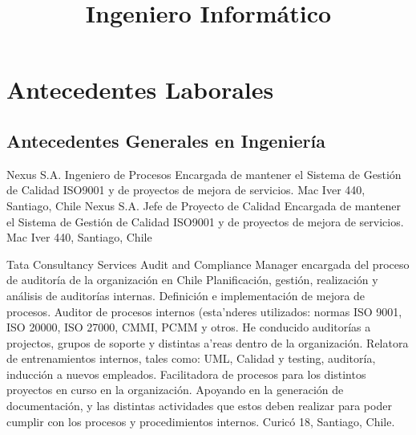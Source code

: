 \documentclass[11pt,letterpaper,roman]{moderncv}
\title{\normalfont \small Ingeniero Informático}
\begin{document}
\maketitle

	
	
\section{Antecedentes Laborales}


\subsection{Antecedentes Generales en Ingeniería}
	{Nexus S.A.} %
	{Ingeniero de Procesos} %
	{Encargada de mantener el Sistema de Gestión de Calidad ISO9001 y de proyectos de mejora de servicios.
	}{}
	{Mac Iver 440, Santiago, Chile}
	{Nexus S.A.} %
	{Jefe de Proyecto de Calidad} %
	{Encargada de mantener el Sistema de Gestión de Calidad ISO9001 y de proyectos de mejora de servicios.
	}{}
	{Mac Iver 440, Santiago, Chile}

	{Tata Consultancy Services} %
	{Audit and Compliance Manager} %
	{encargada del proceso de auditoría de la organización en Chile}
	{Planificación, gestión, realización y análisis de auditorías internas. Definición e implementación de mejora de procesos. 
	Auditor de procesos internos (esta'nderes utilizados: normas ISO 9001, ISO 20000, ISO 27000, CMMI, PCMM y otros.
	He conducido auditorías a projectos, grupos de soporte y distintas a'reas dentro de la organización. 
	Relatora de entrenamientos internos, tales como: UML, Calidad y testing, auditoría, inducción a nuevos empleados.
	Facilitadora de procesos para los distintos proyectos en curso en la organización.
	Apoyando en la generación de documentación, y las distintas actividades que estos deben realizar para poder cumplir con los procesos y procedimientos internos.
	}
	{Curicó 18, Santiago, Chile.}
	
\end{document}
